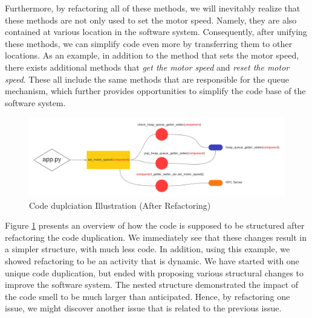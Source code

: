 Furthermore, by refactoring all of these methods, we will inevitably realize that these methods are not only used to set the motor speed. Namely, they are also contained at various location in the software system. Consequently, after unifying these methods, we can simplify code even more by transferring them to other locations. As an example, in addition to the method that sets the motor speed, there exists additional methods that \emph{get the motor speed} and \emph{reset the motor speed}. These all include the same methods that are responsible for the queue mechanism, which further provides  opportunities to simplify the code base of the software system. 

\begin{figure}[H]
    \centering
    \label{fig:simplified}
    \includegraphics[width=\textwidth]{./assets/board_simplified}
    \caption{Code duplciation Illustration (After Refactoring)}
\end{figure}

Figure \ref{fig:simplified} presents an overview of how the code is supposed to be structured after refactoring the code duplication. We immediately see that these changes result in a simpler structure, with much less code. In addition, using this example, we showed refactoring to be an activity that is dynamic. We have started with one unique code duplication, but ended with proposing various structural changes to improve the software system. The nested structure demonstrated the impact of the code smell to be much larger than anticipated. Hence, by refactoring one issue, we might discover another issue that is related to the previous issue. 